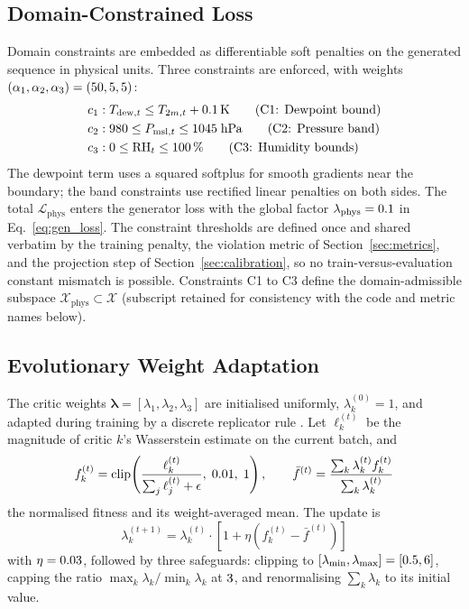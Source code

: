 \documentclass[preprint,12pt]{elsarticle}
\newcommand{\Lc}{\mathcal{L}}
\newcommand{\blambda}{\boldsymbol{\lambda}}
\begin{document}
\subsection{Domain-Constrained Loss}
\label{sec:physics}

Domain constraints are embedded as differentiable soft penalties on the
generated sequence in physical units.  Three constraints are enforced,
with weights $(\alpha_1, \alpha_2, \alpha_3) =
(50, 5, 5)$:
\begin{align}
  c_1:\;& T_{\mathrm{dew},t} \leq T_{2m,t} + 0.1\,\mathrm{K}
    \tag{C1: Dewpoint bound} \label{eq:c1}\\
  c_2:\;& 980 \leq P_{\mathrm{msl},t} \leq 1045 \;\mathrm{hPa}
    \tag{C2: Pressure band} \label{eq:c2}\\
  c_3:\;& 0 \leq \mathrm{RH}_t \leq 100\,\%
    \tag{C3: Humidity bounds} \label{eq:c3}
\end{align}
The dewpoint term uses a squared softplus for smooth gradients near the
boundary; the band constraints use rectified linear penalties on both
sides.  The total
$\Lc_{\mathrm{phys}}$ enters the generator loss with the global factor
$\lambda_{\mathrm{phys}} = 0.1$ in Eq.~\eqref{eq:gen_loss}.
The constraint thresholds are defined once and shared verbatim by the
training penalty, the violation metric of Section~\ref{sec:metrics}, and
the projection step of Section~\ref{sec:calibration}, so no
train-versus-evaluation constant mismatch is possible.  Constraints C1
to C3 define the domain-admissible subspace
$\mathcal{X}_{\mathrm{phys}} \subset \mathcal{X}$ (subscript retained for
consistency with the code and metric names below).

\subsection{Evolutionary Weight Adaptation}
\label{sec:evo}

The critic weights $\blambda = [\lambda_1, \lambda_2, \lambda_3]$ are
initialised uniformly, $\lambda_k^{(0)} = 1$, and adapted during
training by a discrete replicator rule \cite{taylor1978evolutionary}.
Let $\ell_k^{(t)}$ be the magnitude of critic $k$'s Wasserstein estimate
on the current batch, and
\begin{equation}
  f_k^{(t)} = \mathrm{clip}\!\left(
    \frac{\ell_k^{(t)}}{\sum_j \ell_j^{(t)} + \epsilon},\; 0.01,\; 1
  \right),
  \qquad
  \bar{f}^{(t)}
    = \frac{\sum_k \lambda_k^{(t)} f_k^{(t)}}{\sum_k \lambda_k^{(t)}}
  \label{eq:fitness}
\end{equation}
the normalised fitness and its weight-averaged mean.  The update is
\begin{equation}
  \lambda_k^{(t+1)}
    = \lambda_k^{(t)}
      \cdot \left[1 + \eta \left(f_k^{(t)} - \bar{f}^{(t)}\right)\right]
  \label{eq:replicator}
\end{equation}
with $\eta = 0.03$, followed by three safeguards: clipping to
$[\lambda_{\min}, \lambda_{\max}] = [0.5, 6]$, capping the ratio
$\max_k \lambda_k / \min_k \lambda_k$ at $3$, and renormalising
$\sum_k \lambda_k$ to its initial value.
\end{document}
